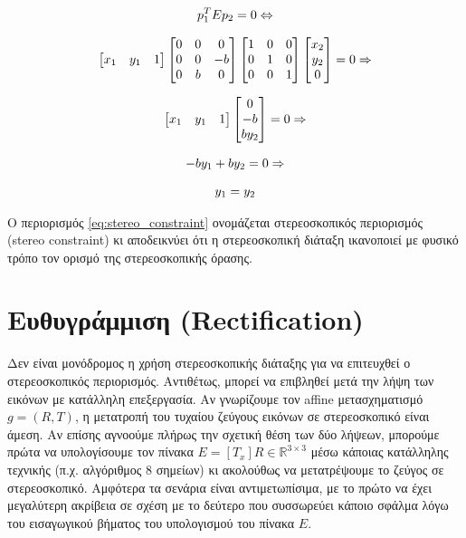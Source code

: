 \begin{equation}
	\setlength{\jot}{10pt}
	\begin{gathered}
		p_1^{T}Ep_2 = 0 \Leftrightarrow 
		\\
		\begin{bmatrix}
		x_1 & y_1 & 1
		\end{bmatrix}
		\begin{bmatrix}
		0 & 0 & 0 \\ 0 & 0 & -b \\ 0 & b & 0
		\end{bmatrix}\begin{bmatrix}
		1 & 0 & 0 \\ 0 & 1 & 0 \\ 0 & 0 & 1
		\end{bmatrix}
		\begin{bmatrix}
		x_2 \\ y_2 \\ 0
		\end{bmatrix} = 0 \Rightarrow
		\\
		\begin{bmatrix}
		x_1 & y_1 & 1
		\end{bmatrix}
		\begin{bmatrix}
		0 \\ -b \\ by_2
		\end{bmatrix} = 0 \Rightarrow
		\\
		-by_1 + by_2 = 0 \Rightarrow
		\\
		y_1 = y_2
	\end{gathered} \label{eq:stereo_constraint}
\end{equation}

Ο περιορισμός \ref{eq:stereo_constraint} ονομάζεται στερεοσκοπικός περιορισμός \e (stereo constraint) \g κι αποδεικνύει ότι η στερεοσκοπική διάταξη ικανοποιεί με φυσικό τρόπο τον ορισμό της στερεοσκοπικής όρασης. 

\section{Ευθυγράμμιση \texorpdfstring{\e (Rectification) \g}{TEXT}}
\label{appendix:stereo_constraint_from_rectification}

Δεν είναι μονόδρομος η χρήση στερεοσκοπικής διάταξης για να επιτευχθεί ο στερεοσκοπικός περιορισμός. Αντιθέτως, μπορεί να επιβληθεί μετά την λήψη των εικόνων με κατάλληλη επεξεργασία. Αν γνωρίζουμε τον \e affine \g μετασχηματισμό $g = (R,T)$, η μετατροπή του τυχαίου ζεύγους εικόνων σε στερεοσκοπικό είναι άμεση\citep{faugeras1993three}. Αν επίσης αγνοούμε πλήρως την σχετική θέση των δύο λήψεων, μπορούμε πρώτα να υπολογίσουμε τον πίνακα $E = [T_x]R \in \mathbb{R}^{3\times3}$ μέσω κάποιας κατάλληλης τεχνικής (π.χ. αλγόριθμος 8 σημείων) κι ακολούθως να μετατρέψουμε το ζεύγος σε στερεοσκοπικό. Αμφότερα τα σενάρια είναι αντιμετωπίσιμα, με το πρώτο να έχει μεγαλύτερη ακρίβεια σε σχέση με το δεύτερο που συσσωρεύει κάποιο σφάλμα λόγω του εισαγωγικού βήματος του υπολογισμού του πίνακα $E$.

